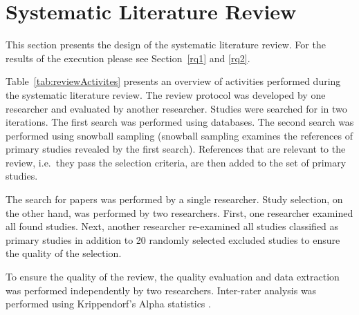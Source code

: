 
\section{\label{slr}Systematic Literature Review}

This section presents the design of the systematic literature review. For the results of the execution please see Section~\ref{rq1} and \ref{rq2}.

Table~\ref{tab:reviewActivites} presents an overview of activities performed during the systematic literature review. The review protocol was developed by one researcher and evaluated by another researcher. Studies were searched for in two iterations. The first search was performed using databases. The second search was performed using snowball sampling \cite{Goodman1961} (snowball sampling examines the references of primary studies revealed by the first search). References that are relevant to the review, i.e.\ they pass the selection criteria, are then added to the set of primary studies.

The search for papers was performed by a single researcher. Study selection, on the other hand, was performed by two researchers. First, one researcher examined all found studies. Next, another researcher re-examined all studies classified as primary studies in addition to 20 randomly selected excluded studies to ensure the quality of the selection.

To ensure the quality of the review, the quality evaluation and data extraction was performed independently by two researchers. Inter-rater analysis was performed using Krippendorf's Alpha statistics \cite{Krippendorff1970,Krippendorff2004a}.


